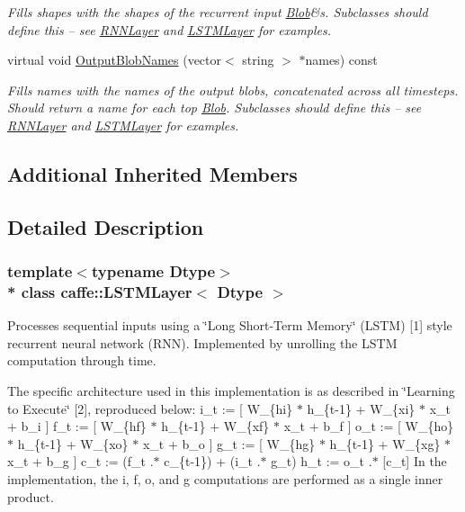 \begin{DoxyCompactItemize}
\begin{DoxyCompactList}\small\item\em Fills shapes with the shapes of the recurrent input \hyperlink{classcaffe_1_1Blob}{Blob}\&s. Subclasses should define this -- see \hyperlink{classcaffe_1_1RNNLayer}{R\+N\+N\+Layer} and \hyperlink{classcaffe_1_1LSTMLayer}{L\+S\+T\+M\+Layer} for examples. \end{DoxyCompactList}\item 
virtual void \hyperlink{classcaffe_1_1LSTMLayer_ae8facc2555769d90b0ecd17ff453ee2a}{Output\+Blob\+Names} (vector$<$ string $>$ $\ast$names) const \hypertarget{classcaffe_1_1LSTMLayer_ae8facc2555769d90b0ecd17ff453ee2a}{}\label{classcaffe_1_1LSTMLayer_ae8facc2555769d90b0ecd17ff453ee2a}

\begin{DoxyCompactList}\small\item\em Fills names with the names of the output blobs, concatenated across all timesteps. Should return a name for each top \hyperlink{classcaffe_1_1Blob}{Blob}. Subclasses should define this -- see \hyperlink{classcaffe_1_1RNNLayer}{R\+N\+N\+Layer} and \hyperlink{classcaffe_1_1LSTMLayer}{L\+S\+T\+M\+Layer} for examples. \end{DoxyCompactList}\end{DoxyCompactItemize}
\subsection*{Additional Inherited Members}


\subsection{Detailed Description}
\subsubsection*{template$<$typename Dtype$>$\\*
class caffe\+::\+L\+S\+T\+M\+Layer$<$ Dtype $>$}

Processes sequential inputs using a \char`\"{}\+Long Short-\/\+Term Memory\char`\"{} (L\+S\+TM) \mbox{[}1\mbox{]} style recurrent neural network (R\+NN). Implemented by unrolling the L\+S\+TM computation through time. 

The specific architecture used in this implementation is as described in \char`\"{}\+Learning to Execute\char`\"{} \mbox{[}2\mbox{]}, reproduced below\+: i\+\_\+t \+:= \mbox{[} W\+\_\+\{hi\} $\ast$ h\+\_\+\{t-\/1\} + W\+\_\+\{xi\} $\ast$ x\+\_\+t + b\+\_\+i \mbox{]} f\+\_\+t \+:= \mbox{[} W\+\_\+\{hf\} $\ast$ h\+\_\+\{t-\/1\} + W\+\_\+\{xf\} $\ast$ x\+\_\+t + b\+\_\+f \mbox{]} o\+\_\+t \+:= \mbox{[} W\+\_\+\{ho\} $\ast$ h\+\_\+\{t-\/1\} + W\+\_\+\{xo\} $\ast$ x\+\_\+t + b\+\_\+o \mbox{]} g\+\_\+t \+:= \mbox{[} W\+\_\+\{hg\} $\ast$ h\+\_\+\{t-\/1\} + W\+\_\+\{xg\} $\ast$ x\+\_\+t + b\+\_\+g \mbox{]} c\+\_\+t \+:= (f\+\_\+t .$\ast$ c\+\_\+\{t-\/1\}) + (i\+\_\+t .$\ast$ g\+\_\+t) h\+\_\+t \+:= o\+\_\+t .$\ast$ \mbox{[}c\+\_\+t\mbox{]} In the implementation, the i, f, o, and g computations are performed as a single inner product.

